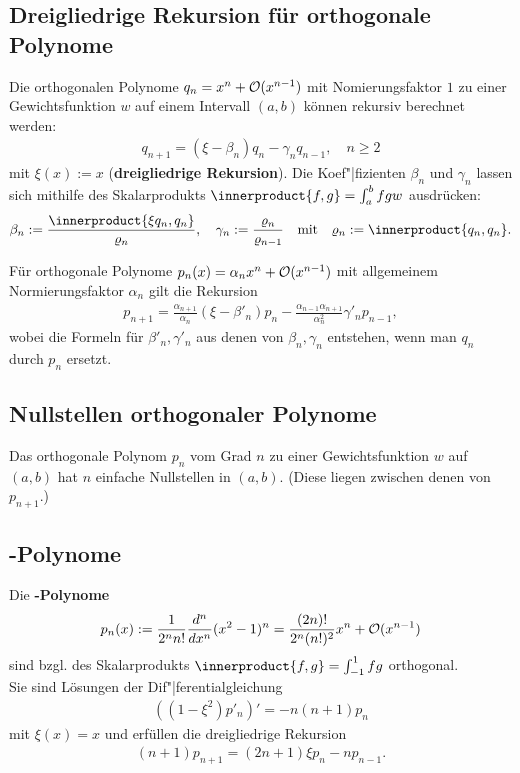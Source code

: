 \pagebreak

\subsection{%
    Dreigliedrige Rekursion für orthogonale Polynome%
}

Die orthogonalen Polynome $q_n = x^n + \mathcal{O}(x^{n-1})$ mit Nomierungsfaktor $1$
zu einer Gewichtsfunktion $w$ auf einem Intervall $(a, b)$ können rekursiv
berechnet werden:
\begin{align*}
    q_{n+1} = (\xi - \beta_n) q_n - \gamma_n q_{n-1},\quad
    n \ge 2
\end{align*}
mit $\xi(x) := x$
(\textbf{dreigliedrige Rekursion}).
Die Koef"|fizienten $\beta_n$ und $\gamma_n$ lassen sich mithilfe des
Skalarprodukts
$\innerproduct{f, g} = \int_a^b f g w$ ausdrücken:
\begin{align*}
    \beta_n := \frac{\innerproduct{\xi q_n, q_n}}{\varrho_n},\quad
    \gamma_n := \frac{\varrho_n}{\varrho_{n-1}}
    \quad\text{mit}\quad \varrho_n := \innerproduct{q_n, q_n}.
\end{align*}

Für orthogonale Polynome $p_n(x) = \alpha_n x^n + \mathcal{O}(x^{n-1})$ mit
allgemeinem Normierungsfaktor $\alpha_n$ gilt die Rekursion
\begin{align*}
    p_{n+1} = \frac{\alpha_{n+1}}{\alpha_n} (\xi - \beta'_n) p_n -
    \frac{\alpha_{n-1} \alpha_{n+1}}{\alpha_n^2} \gamma'_n p_{n-1},
\end{align*}
wobei die Formeln für $\beta'_n, \gamma'_n$ aus denen von $\beta_n, \gamma_n$
entstehen, wenn man $q_n$ durch $p_n$ ersetzt.

\subsection{%
    Nullstellen orthogonaler Polynome%
}

Das orthogonale Polynom $p_n$ vom Grad $n$ zu einer Gewichtsfunktion $w$
auf $(a, b)$ hat $n$ einfache Nullstellen in $(a, b)$.
(Diese liegen zwischen denen von $p_{n+1}$.)

\subsection{%
    -Polynome%
}

Die \textbf{-Polynome}
\begin{align*}
    p_n(x) := \frac{1}{2^n n!} \frac{d^n}{dx^n} (x^2 - 1)^n
    = \frac{(2n)!}{2^n (n!)^2} x^n + \mathcal{O}(x^{n-1})
\end{align*}
sind bzgl. des Skalarprodukts $\innerproduct{f, g} = \int_{-1}^1 f g$
orthogonal. \\
Sie sind Lösungen der Dif"|ferentialgleichung
\begin{align*}
    ((1 - \xi^2) p'_n)' = -n (n + 1) p_n
\end{align*}
mit $\xi(x) = x$ und erfüllen die dreigliedrige Rekursion
\begin{align*}
    (n + 1) p_{n+1} = (2n + 1) \xi p_n - n p_{n-1}.
\end{align*}

